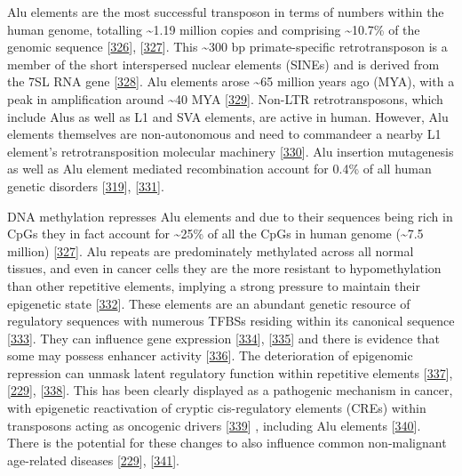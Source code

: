 \documentclass[
]{book}
\begin{document}
Alu elements are the most successful transposon in terms of numbers within the human genome, totalling \textasciitilde1.19 million copies and comprising \textasciitilde10.7\% of the genomic sequence {[}\protect\hyperlink{ref-Dewannieux2003}{326}{]}, {[}\protect\hyperlink{ref-Deininger2011}{327}{]}.
This \textasciitilde300 bp primate-specific retrotransposon is a member of the short interspersed nuclear elements (SINEs) and is derived from the 7SL RNA gene {[}\protect\hyperlink{ref-Ullu1984}{328}{]}.
Alu elements arose \textasciitilde65 million years ago (MYA), with a peak in amplification around \textasciitilde40 MYA {[}\protect\hyperlink{ref-Ade2013}{329}{]}.
Non-LTR retrotransposons, which include Alus as well as L1 and SVA elements, are active in human.
However, Alu elements themselves are non-autonomous and need to commandeer a nearby L1 element's retrotransposition molecular machinery {[}\protect\hyperlink{ref-Cordaux2009}{330}{]}.
Alu insertion mutagenesis as well as Alu element mediated recombination account for 0.4\% of all human genetic disorders {[}\protect\hyperlink{ref-Kazazian2017}{319}{]}, {[}\protect\hyperlink{ref-Belancio2008}{331}{]}.

DNA methylation represses Alu elements and due to their sequences being rich in CpGs they in fact account for \textasciitilde25\% of all the CpGs in human genome (\textasciitilde7.5 million) {[}\protect\hyperlink{ref-Deininger2011}{327}{]}.
Alu repeats are predominately methylated across all normal tissues, and even in cancer cells they are the more resistant to hypomethylation than other repetitive elements, implying a strong pressure to maintain their epigenetic state {[}\protect\hyperlink{ref-Jorda2017}{332}{]}.
These elements are an abundant genetic resource of regulatory sequences with
numerous TFBSs residing within its canonical sequence {[}\protect\hyperlink{ref-Polak2006}{333}{]}.
They can influence gene expression {[}\protect\hyperlink{ref-Chen2017b}{334}{]}, {[}\protect\hyperlink{ref-RobertoFerrari2019}{335}{]} and there is evidence that some may possess enhancer activity {[}\protect\hyperlink{ref-Su2014}{336}{]}.
The deterioration of epigenomic repression can unmask latent regulatory function within repetitive elements {[}\protect\hyperlink{ref-Ward2013}{337}{]}, {[}\protect\hyperlink{ref-Chuong2017}{229}{]}, {[}\protect\hyperlink{ref-Xie2013}{338}{]}.
This has been clearly displayed as a pathogenic mechanism in cancer, with epigenetic reactivation of cryptic cis-regulatory elements (CREs) within transposons acting as oncogenic drivers {[}\protect\hyperlink{ref-Jang2019}{339}{]} , including Alu elements {[}\protect\hyperlink{ref-Rajendiran2016}{340}{]}.
There is the potential for these changes to also influence common non-malignant age-related diseases {[}\protect\hyperlink{ref-Chuong2017}{229}{]}, {[}\protect\hyperlink{ref-Payer2017}{341}{]}.
\end{document}
